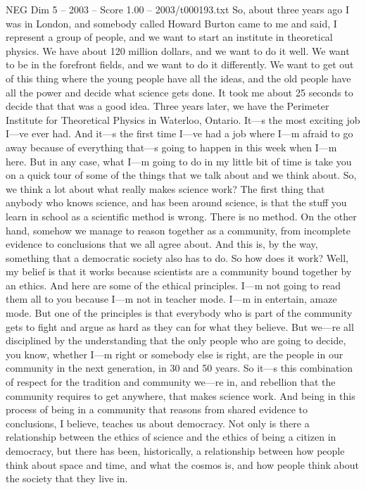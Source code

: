 \begin{textsample}{NEG Dim 5 – 2003 – Score 1.00 – 2003/t000193.txt}  \label{ex:f5_neg_060}
So, about three years ago I was in London, and somebody called Howard Burton came to me and said, I represent a group of people, and we want to start an institute in theoretical physics.
We have about 120 million dollars, and we want to do it well.
We want to be in the forefront fields, and we want to do it differently.
We want to get out of this thing where the young people have all the ideas, and the old people have all the power and decide what science gets done.
It took me about 25 seconds to decide that that was a good idea.
Three years later, we have the Perimeter Institute for Theoretical Physics in Waterloo, Ontario.
It—s the most exciting job I—ve ever had.
And it—s the first time I—ve had a job where I—m afraid to go away because of everything that—s going to happen in this week when I—m here.
But in any case, what I—m going to do in my little bit of time is take you on a quick tour of some of the things that we talk about and we think about.
So, we think a lot about what really makes science work?
The first thing that anybody who knows science, and has been around science, is that the stuff you learn in school as a scientific method is wrong.
There is no method.
On the other hand, somehow we manage to reason together as a community, from incomplete evidence to conclusions that we all agree about.
And this is, by the way, something that a democratic society also has to do.
So how does it work?
Well, my belief is that it works because scientists are a community bound together by an ethics.
And here are some of the ethical principles.
I—m not going to read them all to you because I—m not in teacher mode.
I—m in entertain, amaze mode.
But one of the principles is that everybody who is part of the community gets to fight and argue as hard as they can for what they believe.
But we—re all disciplined by the understanding that the only people who are going to decide, you know, whether I—m right or somebody else is right, are the people in our community in the next generation, in 30 and 50 years.
So it—s this combination of respect for the tradition and community we—re in, and rebellion that the community requires to get anywhere, that makes science work.
And being in this process of being in a community that reasons from shared evidence to conclusions, I believe, teaches us about democracy.
Not only is there a relationship between the ethics of science and the ethics of being a citizen in democracy, but there has been, historically, a relationship between how people think about space and time, and what the cosmos is, and how people think about the society that they live in.

\end{textsample}
